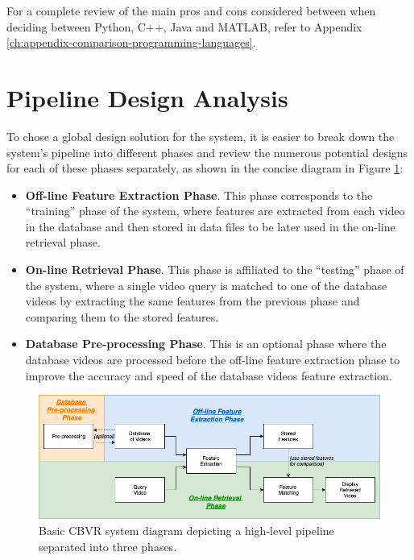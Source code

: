For a complete review of the main pros and cons considered between when deciding between Python, C++, Java and MATLAB, refer to Appendix \ref{ch:appendix-comparison-programming-languages}.


\section{Pipeline Design Analysis}

To chose a global design solution for the system, it is easier to break down the system’s pipeline into different phases and review the numerous potential designs for each of these phases separately, as shown in the concise diagram in Figure \ref{fig:basic-cbvr-diagram}:

\begin{itemize}
    \item \textbf{Off-line Feature Extraction Phase}. This phase corresponds to the ``training'' phase of the system, where features are extracted from each video in the database and then stored in data files to be later used in the on-line retrieval phase.
    \item \textbf{On-line Retrieval Phase}. This phase is affiliated to the ``testing'' phase of the system, where a single video query is matched to one of the database videos by extracting the same features from the previous phase and comparing them to the stored features.
    \item \textbf{Database Pre-processing Phase}. This is an optional phase where the database videos are processed before the off-line feature extraction phase to improve the accuracy and speed of the database videos feature extraction.
\end{itemize}

\begin{figure}[h]
\centerline{\includegraphics[width=1.1\textwidth]{figures/design/basic_cbvr_phases.png}}
\caption{\label{fig:basic-cbvr-diagram}Basic CBVR system diagram depicting a high-level pipeline separated into three phases.}
\end{figure}




